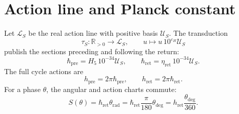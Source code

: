 \section{Action line and Planck constant}
\label{sec:l9s102:recta-planck}

Let \(\mathcal L_S\) be the real action line with positive basis
\(\mathcal U_S\). The transduction
\begin{equation}
 \tau_S:\mathbb R_{>0}\longrightarrow\mathcal L_S,
 \qquad u\longmapsto u\,10^{\varepsilon_H}\mathcal U_S
 \label{eq:l9s102:transductor-accion}
\end{equation}
publish the sections preceding and following the return:
\begin{equation}
 \hbar_{\mathrm{pre}}=H_5\,10^{-34}\mathcal U_S,
 \qquad
 \boxed{
 \hbar_{\mathrm{ret}}=\eta_{\mathrm{ret}}\,10^{-34}\mathcal U_S.}
 \label{eq:l9s102:hbar-pre-ret}
\end{equation}
The full cycle actions are
\begin{equation}
 h_{\mathrm{pre}}=2\pi\hbar_{\mathrm{pre}},
 \qquad
 h_{\mathrm{ret}}=2\pi\hbar_{\mathrm{ret}}.
 \label{eq:l9s102:h-pre-ret}
\end{equation}
For a phase \(\theta\), the angular and action charts commute:
\begin{equation}
 S(\theta)
 =\hbar_{\mathrm{ret}}\theta_{\mathrm{rad}}
 =\hbar_{\mathrm{ret}}\frac{\pi}{180}\theta_{\deg}
 =h_{\mathrm{ret}}\frac{\theta_{\deg}}{360}.
 \label{eq:l9s102:accion-fase}
\end{equation}


